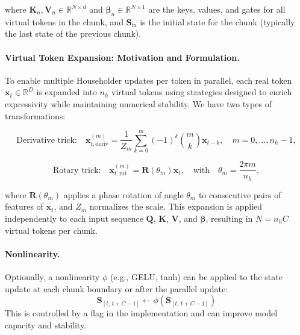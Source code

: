 \documentclass[10pt,a4paper]{article}
\begin{document}
where $\mathbf{K}_n, \mathbf{V}_n \in \mathbb{R}^{N \times d}$ and $\boldsymbol{\beta}_n \in \mathbb{R}^{N \times 1}$ are the keys, values, and gates for all virtual tokens in the chunk, and $\mathbf{S}_{\mathrm{in}}$ is the initial state for the chunk (typically the last state of the previous chunk).


\paragraph{Virtual Token Expansion: Motivation and Formulation.}

To enable multiple Householder updates per token in parallel, each real token $\mathbf{x}_t \in \mathbb{R}^D$ is expanded into $n_h$ virtual tokens using strategies designed to enrich expressivity while maintaining numerical stability. We have two types of transformations:

\begin{equation}
    \text{Derivative trick:} \quad \mathbf{x}_{t,\mathrm{deriv}}^{(m)} = \frac{1}{Z_m} \sum_{k=0}^m (-1)^k \binom{m}{k} \mathbf{x}_{t-k}, \quad m=0,\ldots,n_h - 1,
    \label{eq:derivative-trick}
\end{equation}

\begin{equation}
    \text{Rotary trick:} \quad \mathbf{x}_{t,\mathrm{rot}}^{(m)} = \mathbf{R}(\theta_m) \mathbf{x}_t, \quad \text{with} \quad \theta_m = \frac{2\pi m}{n_h},
    \label{eq:rotative-trick}
\end{equation}

where $\mathbf{R}(\theta_m)$ applies a phase rotation of angle $\theta_m$ to consecutive pairs of features of $\mathbf{x}_t$, and $Z_m$ normalizes the scale. This expansion is applied independently to each input sequence $\mathbf{Q}$, $\mathbf{K}$, $\mathbf{V}$, and $\boldsymbol{\beta}$, resulting in $N = n_h C$ virtual tokens per chunk.


\paragraph{Nonlinearity.}

Optionally, a nonlinearity $\phi$ (e.g., GELU, tanh) can be applied to the state update at each chunk boundary or after the parallel update:
\begin{equation}
    \mathbf{S}_{[t,\,t+C-1]} \leftarrow \phi(\mathbf{S}_{[t,\,t+C-1]})
\end{equation}
This is controlled by a flag in the implementation and can improve model capacity and stability.
\end{document}
